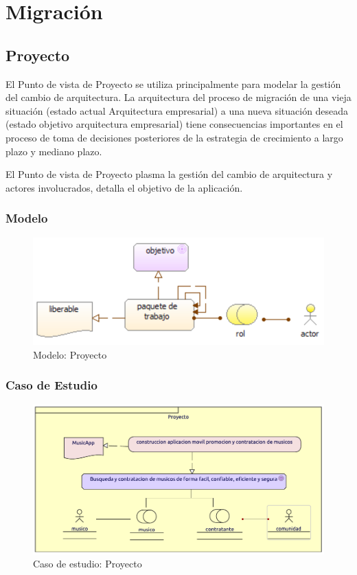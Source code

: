 \chapter{Migración}

\section{Proyecto}
El Punto de vista de Proyecto se utiliza principalmente para modelar la gestión del cambio de arquitectura. La arquitectura del proceso de migración de una vieja situación (estado actual Arquitectura empresarial) a una nueva situación deseada (estado objetivo arquitectura empresarial) tiene consecuencias importantes en el proceso de toma de decisiones posteriores de la estrategia de crecimiento a largo plazo y mediano plazo. \cite{ArchiMat55:online} \vspace{\baselineskip}

El Punto de vista de Proyecto plasma la gestión del cambio de arquitectura y actores involucrados, detalla el objetivo de la aplicación.

\subsection{Modelo}
\begin{figure}[h!]
	\centering
	\includegraphics[width=0.8\linewidth]{Arquitectura/Migracion/imgs/ProyectoMetamodelo.PNG}
	\caption{Modelo:  Proyecto}
\end{figure}
\newpage
\subsection{Caso de Estudio}
\begin{figure}[h!]
	\centering
	\includegraphics[width=\linewidth]{Arquitectura/Migracion/imgs/Proyecto.pdf}
	\caption{Caso de estudio: Proyecto}
	\label{fig:comportamiento}
\end{figure}

